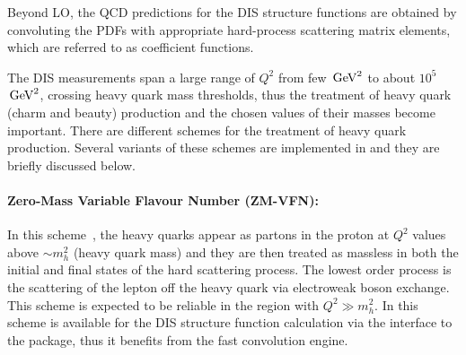 Beyond LO, the QCD predictions for the DIS structure functions are obtained by convoluting 
the PDFs with appropriate hard-process scattering matrix elements, which are referred to as coefficient functions. 


%

The DIS measurements span a large range of $Q^2$ from few $\,\text{Ge\hspace{-.08em}V}^2$ to about $10^5$ $\,\text{Ge\hspace{-.08em}V}^2$, crossing heavy quark mass thresholds, thus the treatment of heavy quark (charm and beauty) 
production and the chosen values of their masses become important. 
There are different schemes for the treatment of heavy quark production. 
Several variants of these schemes are implemented in \fitter and they are briefly discussed below.

\paragraph{Zero-Mass Variable Flavour Number (ZM-VFN)\rm:\\}
In this scheme~\cite{ZMVFNpub}, the
heavy quarks appear as partons in the proton at $Q^2$ values above $\sim m_h^2$ (heavy quark mass)
and they
are then treated as massless in both the initial 
and final states of the hard scattering process. The lowest order process is the
scattering of the lepton off the heavy quark via electroweak boson exchange.
This scheme is expected to be reliable in the region with $Q^2 \gg m_h^2$.
In \fitter this scheme is available for the DIS structure function calculation 
via the interface to the \qcdnum \cite{qcdnum} package, thus it benefits 
from the fast \qcdnum convolution engine.

